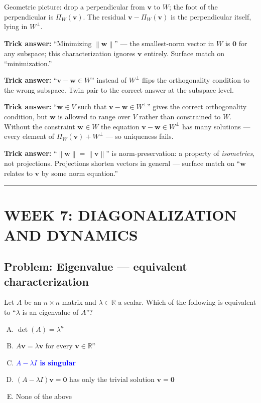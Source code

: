 \documentclass[12pt]{amsart}
\newcommand{\divider}{
  \vspace{-1em}
  \noindent
  \raisebox{-0.15ex}{\textbullet}%
  \hspace{0.5em}%
  \rule[0.5ex]{0.95\textwidth}{1.0pt}%
  \hspace{0.5em}%
  \raisebox{-0.15ex}{\textbullet}%
  \vspace{0em}
}
\newcommand{\norm}[1]{\left\|#1\right\|}
\begin{document}
Geometric picture: drop a perpendicular from $\mathbf{v}$ to $W$; the foot
of the perpendicular is $\Pi_W(\mathbf{v})$. The residual
$\mathbf{v} - \Pi_W(\mathbf{v})$ is the perpendicular itself, lying in $W^\perp$.

\textbf{Trick answer:}
``Minimizing $\norm{\mathbf{w}}$'' --- the smallest-norm vector in $W$ is
$\mathbf{0}$ for any subspace; this characterization ignores $\mathbf{v}$
entirely. Surface match on ``minimization.''

\textbf{Trick answer:}
``$\mathbf{v} - \mathbf{w} \in W$'' instead of $W^\perp$ flips the
orthogonality condition to the wrong subspace. Twin pair to the correct
answer at the subspace level.

\textbf{Trick answer:}
``$\mathbf{w} \in V$ such that $\mathbf{v} - \mathbf{w} \in W^\perp$''
gives the correct orthogonality condition, but $\mathbf{w}$ is allowed to
range over $V$ rather than constrained to $W$. Without the constraint
$\mathbf{w} \in W$ the equation $\mathbf{v} - \mathbf{w} \in W^\perp$ has
many solutions --- every element of $\Pi_W(\mathbf{v}) + W^\perp$ --- so
uniqueness fails.

\textbf{Trick answer:}
``$\norm{\mathbf{w}} = \norm{\mathbf{v}}$'' is norm-preservation: a property
of \emph{isometries}, not projections. Projections shorten vectors in
general --- surface match on ``$\mathbf{w}$ relates to $\mathbf{v}$ by some
norm equation.''

\divider

\section*{WEEK 7: DIAGONALIZATION AND DYNAMICS}

\subsection*{Problem: Eigenvalue --- equivalent characterization}

Let $A$ be an $n \times n$ matrix and $\lambda \in \mathbb{R}$ a scalar.
Which of the following is equivalent to ``$\lambda$ is an eigenvalue of $A$''?

\begin{enumerate}[(A)]
\item $\det(A) = \lambda^n$
\item $A\mathbf{v} = \lambda \mathbf{v}$ for every $\mathbf{v} \in \mathbb{R}^n$
\item \textcolor{blue}{\textbf{$A - \lambda I$ is singular}}
\item $(A - \lambda I)\mathbf{v} = \mathbf{0}$ has only the trivial solution $\mathbf{v} = \mathbf{0}$
\item None of the above
\end{enumerate}
\end{document}
